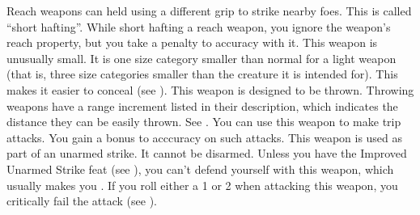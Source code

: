 Reach weapons can held using a different grip to strike nearby foes. This is called ``short hafting''. While short hafting a reach weapon, you ignore the weapon's reach property, but you take a  penalty to accuracy with it.
 This weapon is unusually small. It is one size category smaller than normal for a light weapon (that is, three size categories smaller than the creature it is intended for). This makes it easier to conceal (see ).
 This weapon is designed to be thrown. Throwing weapons have a range increment listed in their description, which indicates the distance they can be easily thrown. See .
 You can use this weapon to make trip attacks. You gain a  bonus to acccuracy on such attacks.
 This weapon is used as part of an unarmed strike. It cannot be disarmed. Unless you have the Improved Unarmed Strike feat (see ), you can't defend yourself with this weapon, which usually makes you .
 If you roll either a 1 or 2 when attacking this weapon, you critically fail the attack (see ).

